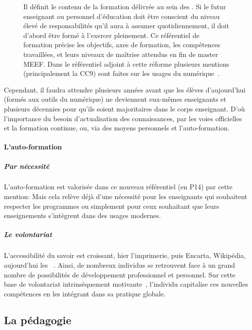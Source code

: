 \begin{figure}[!h]
            \begin{minipage}{0.43\linewidth}
            \myDefautStyle
                Il définit le contenu de la formation délivrée au sein des . Si le futur enseignant ou personnel d'éducation doit être conscient du niveau élevé de responsabilités qu'il aura à assumer quotidiennement, il doit d'abord être formé à l'exercer pleinement. Ce référentiel de formation précise les objectifs, axes de formation, les compétences travaillées, et leurs niveaux de maîtrise attendus en fin de master MEEF.
                Dans le référentiel adjoint à cette réforme plusieurs mentions (principalement la CC9) sont faites sur les usages du numérique~.
            \end{minipage}
            \end{figure}\par%
             Cependant, il faudra attendre plusieurs années avant que les élèves d'aujourd'hui (formés aux outils du numérique) ne deviennent eux-mêmes enseignants et plusieurs décennies pour qu'ils soient majoritaires dans le corps enseignant. D'où l'importance du besoin d'actualisation des connaissances, par les voies officielles et la formation continue, ou, via des moyens personnels et l'auto-formation.
        \paragraph{L'auto-formation}\label{sec:auto-formation}
            \subparagraph{Par nécessité}
                L'auto-formation est valorisée dans ce nouveau référentiel (en P14) par cette mention: 
                Mais cela relève déjà d'une nécessité pour les enseignants qui souhaitent respecter les programmes ou simplement pour ceux souhaitant que leurs enseignements s'intègrent dans des usages modernes.  
            \subparagraph{Le volontariat}
                L'accessibilité du savoir est croissant, hier l'imprimerie, puis Encarta, Wikipédia, aujourd'hui les ~. Ainsi, de nombreux individus se retrouvent face à un grand nombre de possibilités de développement professionnel et personnel. Sur cette base de volontariat intrinsèquement motivante~, l'individu capitalise ces nouvelles compétences en les intégrant dans sa pratique globale.
    \subsection{La pédagogie}\label{sec:peda_edu}
